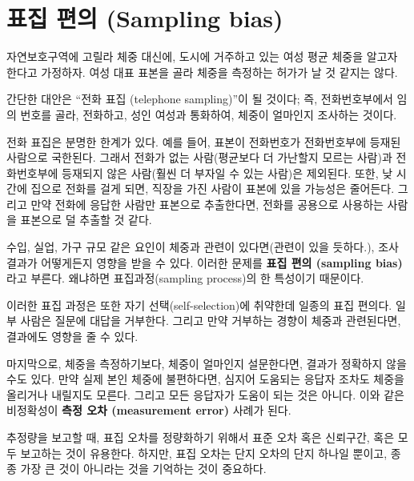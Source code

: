 \section{표집 편의 (Sampling bias)}

자연보호구역에 고릴라 체중 대신에, 도시에 거주하고 있는 여성 평균 체중을 알고자 한다고 가정하자. 여성 대표 표본을 골라 체중을 측정하는 허가가 날 것 같지는 않다.


간단한 대안은 ``전화 표집 (telephone sampling)''이 될 것이다; 
즉, 전화번호부에서 임의 번호를 골라, 전화하고, 성인 여성과 통화하여, 체중이 얼마인지 조사하는 것이다. 


전화 표집은 분명한 한계가 있다.
예를 들어, 표본이 전화번호가 전화번호부에 등재된 사람으로 국한된다.
그래서 전화가 없는 사람(평균보다 더 가난할지 모르는 사람)과 전화번호부에 등재되지 않은 사람(훨씬 더 부자일 수 있는 사람)은 제외된다. 
또한, 낮 시간에 집으로 전화를 걸게 되면, 직장을 가진 사람이 표본에 있을 가능성은 줄어든다. 그리고 만약 전화에 응답한 사람만 표본으로 추출한다면, 전화를 공용으로 사용하는 사람을 표본으로 덜 추출할 것 같다.

수입, 실업, 가구 규모 같은 요인이 체중과 관련이 있다면(관련이 있을 듯하다.), 조사 결과가 어떻게든지 영향을 받을 수 있다. 이러한 문제를 {\bf 표집 편의 (sampling bias)}라고 부른다. 왜냐하면 표집과정(sampling process)의 한 특성이기 때문이다.

이러한 표집 과정은 또한 자기 선택(self-selection)에 취약한데 일종의 표집 편의다.
일부 사람은 질문에 대답을 거부한다. 그리고 만약 거부하는 경향이 체중과 관련된다면, 결과에도 영향을 줄 수 있다.

마지막으로, 체중을 측정하기보다, 체중이 얼마인지 설문한다면, 결과가 정확하지 않을 수도 있다.
만약 실제 본인 체중에 불편하다면, 심지어 도움되는 응답자 조차도 체중을 올리거나 내릴지도 모른다. 그리고 모든 응답자가 도움이 되는 것은 아니다.
이와 같은 비정확성이 {\bf 측정 오차 (measurement error)} 사례가 된다.

추정량을 보고할 때, 표집 오차를 정량화하기 위해서 표준 오차 혹은 신뢰구간, 혹은 모두 보고하는 것이 유용한다.
하지만, 표집 오차는 단지 오차의 단지 하나일 뿐이고, 종종 가장 큰 것이 아니라는 것을 기억하는 것이 중요하다.


